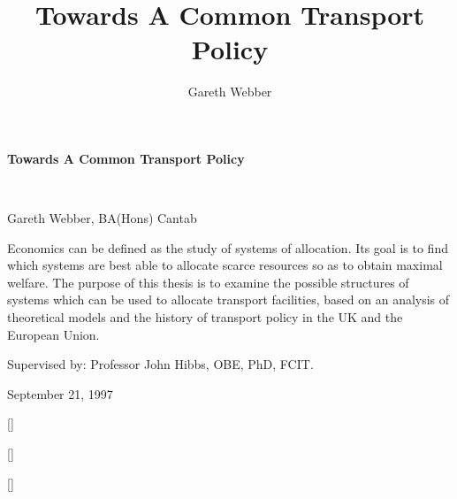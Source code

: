 \documentclass[11pt]{report}
\begin{document}
\begin{titlepage}
\pagecolor{titlepagecolor}\color{white}
{\noindent \titlefont \LARGE \bfseries Towards A Common Transport Policy}\title{Towards A Common Transport Policy}\\
\makebox[0pt][l]{\rule{1.3\textwidth}{2pt}}
\par {\noindent \titlefont \textcolor{namecolor}{Gareth Webber, BA(Hons) Cantab}}\author{Gareth Webber}
\vskip 3cm
{\noindent \titlefont  Economics can be defined as the study of systems of allocation. Its goal is to find which systems are best able to allocate scarce resources so as to obtain maximal welfare. The purpose of this thesis is to examine the possible structures of systems which can be used to allocate transport facilities, based on an analysis of theoretical models and the history of transport policy in the UK and the European Union.}
\par {\noindent  \textcolor{namecolor}{Supervised by: Professor John Hibbs, OBE, PhD, FCIT.}}
\par {\noindent  \textcolor{namecolor}{September 21, 1997}}
\end{titlepage}
\restoregeometry 
\pagecolor{white}

\titleformat{\chapter}[block]{\Huge\titlefont\bfseries}{\thechapter}{0ex}{\centering} []
\tableofcontents
\listoftables
\listoffigures

\titleformat{\chapter}[block]{\Huge\titlefont\bfseries}{\centering\thechapter\vskip -10pt}{0ex}{\centering\rule{0.3\textwidth}{2pt}\vskip 0pt\centering} []

	
		





\titleformat{\chapter}[block]{\Huge\titlefont\bfseries}{\thechapter}{0ex}{\centering} []


\end{document}
